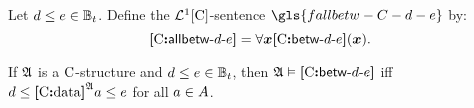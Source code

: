 \begin{definition}
Let $\datad \leq \datae \in \tBitnums\tbit$.
Define the $\vFoF1\CS$-sentence $\gls{fallbetw-C-d-e}$ by:
\[
  \fallbetw\CS\datad\datae = \forall\xx\fbetw\CS\datad\datae(\xx).
\]
\end{definition}
\begin{remark}
If $\StrA$ is a $\CS$-structure and $\datad \leq \datae \in \tBitnums\tbit$,
then $\StrA \vDash \fbetw\CS\datad\datae$ iff
$\datad \leq \data\CS\StrA\ea \leq \datae$ for all $\ea \in \domA$.
\end{remark}